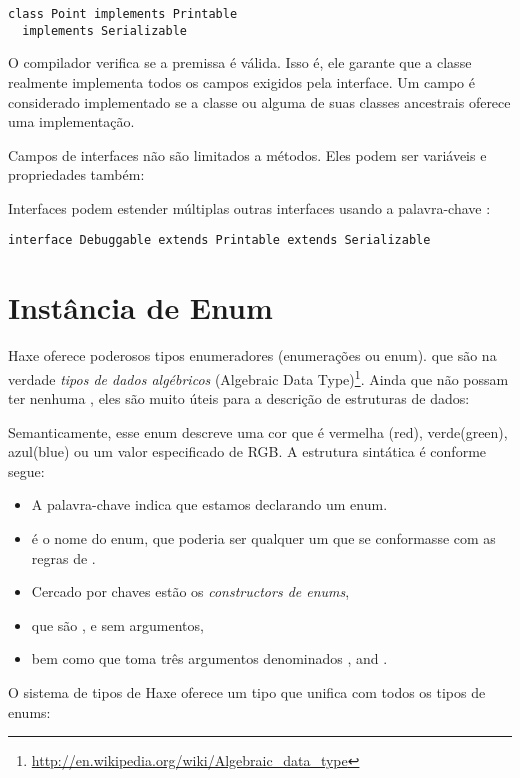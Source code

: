 \begin{lstlisting}
class Point implements Printable
  implements Serializable
\end{lstlisting}

O compilador verifica se a premissa  é válida. Isso é, ele garante que a classe  realmente implementa todos os campos exigidos pela interface. Um campo é considerado implementado se a classe ou alguma de suas classes ancestrais oferece uma implementação.

Campos de interfaces não são limitados a métodos. Eles podem ser variáveis e propriedades também:


Interfaces podem estender múltiplas outras interfaces usando a palavra-chave :
\begin{lstlisting}
interface Debuggable extends Printable extends Serializable
\end{lstlisting}




\section{Instância de Enum}
\label{types-enum-instance}

Haxe oferece poderosos tipos enumeradores (enumerações ou enum). que são na verdade \emph{tipos de dados algébricos} (Algebraic Data Type)\footnote{\url{http://en.wikipedia.org/wiki/Algebraic_data_type}}. Ainda que não possam ter nenhuma  , eles são muito úteis para a descrição de estruturas de dados:

Semanticamente, esse enum descreve uma cor que é vermelha (red), verde(green), azul(blue) ou um valor especificado de RGB. A estrutura sintática é conforme segue:
\begin{itemize}
	\item A palavra-chave  indica que estamos declarando um enum.
	\item {} é o nome do enum, que poderia ser qualquer um que se conformasse com as regras de .
	\item Cercado por chaves \expr{$\left\{\right\}$} estão os \emph{constructors de enums},
	\item que são ,  e  sem argumentos,
	\item bem como  que toma três argumentos  denominados ,  and .
\end{itemize}
O sistema de tipos de Haxe oferece um tipo que unifica com todos os tipos de enums:

